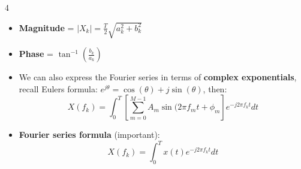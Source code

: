 \documentclass[10pt, landscape]{article}
\begin{document}
\begin{multicols*}{4}
\begin{itemize}
    \item \textbf{Magnitude} = $|X_k| = \frac{T}{2}\sqrt{a_k^2 + b_k^2}$
    \item \textbf{Phase} = $\tan^{-1}\left(\frac{b_k}{a_k}\right)$
    \item We can also express the Fourier series in terms of \textbf{complex exponentials}, recall Eulers formula: $e^{j \theta} = \cos(\theta) + j \sin(\theta)$, then:
    \begin{equation}
      X(f_k) = \int_{0}^{T} [\sum_{m=0}^{M-1} A_m \sin(2 \pi f_m t + \phi_m] e^{-j 2 \pi f_k t} dt
    \end{equation}
    \item \textbf{Fourier series formula} (important):
    \begin{equation}
      X(f_k) = \int_{0}^{T} x(t) e^{-j 2 \pi f_k t} dt
    \end{equation}
  \end{itemize}


\end{multicols*}
\end{document}
